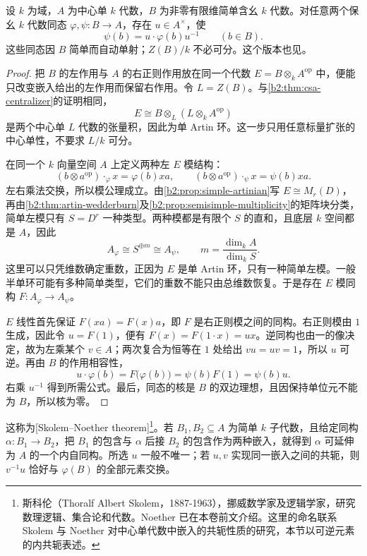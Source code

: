 \begin{theorem}\label{b2:thm:skolem-noether}
	设 \(k\) 为域，\(A\) 为中心单 \(k\) 代数，\(B\) 为非零有限维简单含幺 \(k\) 代数。对任意两个保幺 \(k\) 代数同态 \(\varphi,\psi:B\to A\)，存在 \(u\in A^\times\)，使
	\[
		\psi(b)=u\cdot\varphi(b)u^{-1}\qquad(b\in B).
	\]
	这些同态因 \(B\) 简单而自动单射；\(Z(B)/k\) 不必可分。这个版本也见\cite[Main Theorem 7.7.1]{Voight2021QuaternionAlgebras}。
\end{theorem}
\begin{proof}
	把 \(B\) 的左作用与 \(A\) 的右正则作用放在同一个代数 \(E=B\otimes_kA^{\mathrm{op}}\) 中，便能只改变嵌入给出的左作用而保留右作用。令 \(L=Z(B)\)。与\cref{b2:thm:csa-centralizer}的证明相同，
	\[
		E\cong B\otimes_L(L\otimes_kA^{\mathrm{op}})
	\]
	是两个中心单 \(L\) 代数的张量积，因此为单 Artin 环。这一步只用任意标量扩张的中心单性，不要求 \(L/k\) 可分。

	在同一个 \(k\) 向量空间 \(A\) 上定义两种左 \(E\) 模结构：
	\[
		(b\otimes a^{\mathrm{op}})\cdot_\varphi x=\varphi(b)xa, \qquad (b\otimes a^{\mathrm{op}})\cdot_\psi x=\psi(b)xa.
	\]
	左右乘法交换，所以模公理成立。由\cref{b2:prop:simple-artinian}写 \(E\cong M_r(D)\)，再由\cref{b2:thm:artin-wedderburn}及\cref{b2:prop:semisimple-multiplicity}的矩阵块分类，简单左模只有 \(S=D^r\) 一种类型。两种模都是有限个 \(S\) 的直和，且底层 \(k\) 空间都是 \(A\)，因此
	\[
		A_\varphi\cong S^{\oplus m}\cong A_\psi,\qquad m=\frac{\dim_kA}{\dim_kS}.
	\]
	这里可以只凭维数确定重数，正因为 \(E\) 是单 Artin 环，只有一种简单左模。一般半单环可能有多种简单类型，它们的重数不能只由总维数恢复。于是存在 \(E\) 模同构 \(F:A_\varphi\to A_\psi\)。

	\(E\) 线性首先保证 \(F(xa)=F(x)a\)，即 \(F\) 是右正则模之间的同构。右正则模由 \(1\) 生成，因此令 \(u=F(1)\)，便有 \(F(x)=F(1\cdot x)=ux\)。逆同构也由一的像决定，故为左乘某个 \(v\in A\)；两次复合为恒等在 \(1\) 处给出 \(vu=uv=1\)，所以 \(u\) 可逆。再由 \(B\) 的作用相容性，
	\[
		u\cdot\varphi(b)=F\bigl(\varphi(b)\bigr)=\psi(b)F(1)=\psi(b)u.
	\]
	右乘 \(u^{-1}\) 得到所需公式。最后，同态的核是 \(B\) 的双边理想，且因保持单位元不能为 \(B\)，所以核为零。
\end{proof}

这称为[Skolem--Noether theorem]\footnote{斯科伦（Thoralf Albert Skolem，1887-1963），挪威数学家及逻辑学家，研究数理逻辑、集合论和代数。Noether 已在本卷前文介绍。这里的命名联系 Skolem 与 Noether 对中心单代数中嵌入的共轭性质的研究，本节以可逆元素的内共轭表述。}。若 \(B_1,B_2\subseteq A\) 为简单 \(k\) 子代数，且给定同构 \(\alpha:B_1\to B_2\)，把 \(B_1\) 的包含与 \(\alpha\) 后接 \(B_2\) 的包含作为两种嵌入，就得到 \(\alpha\) 可延伸为 \(A\) 的一个内自同构。所选 \(u\) 一般不唯一；若 \(u,v\) 实现同一嵌入之间的共轭，则 \(v^{-1}u\) 恰好与 \(\varphi(B)\) 的全部元素交换。

